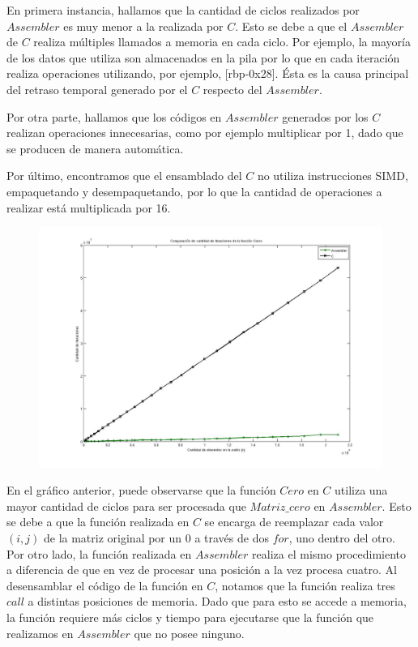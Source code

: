 \documentclass[10pt, a4paper]{article}
\begin{document}
En primera instancia, hallamos que la cantidad de ciclos realizados por $Assembler$ es muy menor a la realizada por $C$. Esto se debe a que el $Assembler$ de $C$ realiza múltiples llamados a memoria en cada ciclo. Por ejemplo, la mayoría de los datos que utiliza son almacenados en la pila por lo que en cada iteración realiza operaciones utilizando, por ejemplo, [rbp-0x28]. Ésta es la causa principal del retraso temporal generado por el $C$ respecto del $Assembler$.\newline 

Por otra parte, hallamos que los códigos en $Assembler$ generados por los $C$ realizan operaciones innecesarias, como por ejemplo multiplicar por 1, dado que se producen de manera automática.\newline

Por último, encontramos que el ensamblado del $C$ no utiliza instrucciones SIMD, empaquetando y desempaquetando, por lo que la cantidad de operaciones a realizar está multiplicada por 16.\newline

\begin{figure}[H] %
\begin{center}
\includegraphics[width=500pt]{../imgs/comparacion_ceros.jpg}
\end{center}
\end{figure}

En el gráfico anterior, puede observarse que la función $Cero$ en $C$ utiliza una mayor cantidad de ciclos para ser procesada que $Matriz\_cero$ en $Assembler$. Esto se debe a que la función realizada en $C$ se encarga de reemplazar cada valor $(i,j)$ de la matriz original por un 0 a través de dos $for$, uno dentro del otro. Por otro lado, la función realizada en $Assembler$ realiza el mismo procedimiento a diferencia de que en vez de procesar una posición a la vez procesa cuatro. 
Al desensamblar el código de la función en $C$, notamos que la función realiza tres $call$ a distintas posiciones de memoria. Dado que para esto se accede a memoria, la función requiere más ciclos y tiempo para ejecutarse que la función que realizamos en $Assembler$ que no posee ninguno.
\end{document}
